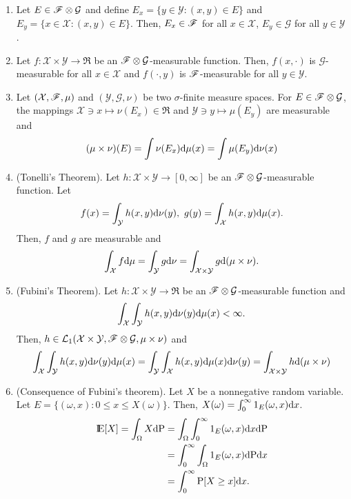 \documentclass[a4paper,10pt]{article}
\begin{document}
\begin{enumerate}
 \item Let $E\in \mathscr{F}\otimes\mathcal{G}$ and define 
       $E_x = \{y\in \mathcal{Y}: (x,y)\in E\}$ and $E_y = \{x\in \mathcal{X}: (x,y)\in E\}$.
       Then, $E_x\in \mathscr{F}$ for all $x\in\mathcal{X}$, $E_y\in\mathcal{G}$ for all $y\in\mathcal{Y}$.
 \item Let $f:\mathcal{X}\times\mathcal{Y}\to \Re$ be an $\mathscr{F}\otimes \mathcal{G}$-measurable function.
       Then, $f(x,\cdot)$ is $\mathcal{G}$-measurable for all $x\in\mathcal{X}$ and 
       $f(\cdot, y)$ is $\mathscr{F}$-measurable for all $y\in\mathcal{Y}$.
 \item Let $(\mathcal{X},\mathscr{F},\mu)$ and $(\mathcal{Y},\mathcal{G},\nu)$ be two $\sigma$-finite measure spaces.
       For $E\in\mathscr{F}\otimes\mathcal{G}$, the mappings $\mathcal{X}\ni x\mapsto \nu(E_x) \in \Re$ and 
       $\mathcal{Y}\ni y\mapsto \mu(E_y)$ are measurable and
       \[
        (\mu\times \nu)(E) = \int \nu(E_x)\mathrm{d} \mu(x) = \int \mu(E_y)\mathrm{d} \nu(x)
       \]
 \item (Tonelli's Theorem). Let $h:\mathcal{X}\times \mathcal{Y}\to[0,\infty]$ be an $\mathscr{F}\otimes\mathcal{G}$-measurable
       function. Let
       \[
        f(x) = \int_{\mathcal{Y}} h(x,y) \mathrm{d}\nu(y), \ g(y) = \int_{\mathcal{X}}h(x,y)\mathrm{d}\mu(x).
       \]
       Then, $f$ and $g$ are measurable and 
       \[
        \int_{\mathcal{X}}f\mathrm{d}\mu = \int_{\mathcal{Y}}g\mathrm{d}\nu = \int_{\mathcal{X}\times\mathcal{Y}}g\mathrm{d}(\mu\times \nu).
       \]
 \item (Fubini's Theorem). 
       Let $h:\mathcal{X}\times \mathcal{Y}\to \Re$ be an $\mathscr{F}\otimes\mathcal{G}$-measurable
       function and
       \[
        \int_{\mathcal{X}} \int_{\mathcal{Y}} h(x,y)\mathrm{d}\nu(y) \mathrm{d}\mu(x) < \infty.
       \]
       Then, $h\in\mathcal{L}_1(\mathcal{X}\times\mathcal{Y}, \mathscr{F}\otimes\mathcal{G}, \mu\times\nu)$ and
        \[
        \int_{\mathcal{X}} \int_{\mathcal{Y}} h(x,y)\mathrm{d}\nu(y) \mathrm{d}\mu(x) = 
        \int_{\mathcal{Y}} \int_{\mathcal{X}} h(x,y)\mathrm{d}\mu(x) \mathrm{d}\nu(y) = 
        \int_{\mathcal{X}\times\mathcal{Y}} h \mathrm{d}(\mu\times \nu)
       \]
       
 \item (Consequence of Fubini's theorem). Let $X$ be a nonnegative random variable. Let $E=\{(\omega, x): 0 \leq x\leq X(\omega)\}$.
       Then, $X(\omega) = \int_{0}^{\infty}1_{E}(\omega, x)\mathrm{d} x$.
       \begin{align*}
        \E[X] = \int_{\Omega}X\d\prob &= \int_{\Omega}\int_{0}^{\infty}1_{E}(\omega, x)\d x\d \prob\\
                                      &= \int_{0}^{\infty} \int_{\Omega} 1_{E}(\omega, x)\d \prob \d x\\
                                      &= \int_{0}^{\infty} \prob[X\geq x]\d x.
       \end{align*}

\end{enumerate}
\end{document}
